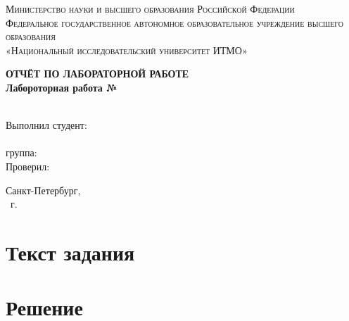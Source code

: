 \documentclass[14pt,a4paper,report]{ncc}
\begin{document}
\begin{titlepage}
\begin{center}
\textsc{Министерство науки и высшего образования Российской Федерации
\\[5mm]
Федеральное государственное автономное образовательное учреждение высшего образования\\[2mm]
«Национальный исследовательский университет ИТМО»\\[2mm]
}

\vfill

\textbf{ОТЧЁТ ПО ЛАБОРАТОРНОЙ РАБОТЕ\\[3mm]
Лабороторная работа №\\[6mm]
\\[20mm]
}
\end{center}

\hfill
\begin{minipage}{.5\textwidth}
Выполнил студент:\\[2mm]
\\
группа: \\[5mm]

Проверил:\\[2mm]
\end{minipage}%
\vfill
\begin{center}
 Санкт-Петербург, \\ \theyear\ г.
\end{center}
\end{titlepage}

\newpage
\setcounter{chapter}{1}
\section{Текст задания}

\section{Решение}

\end{document}
